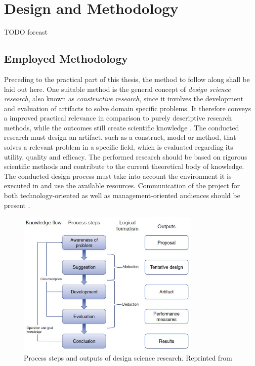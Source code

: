 \chapter{Design and Methodology}
\label{chap:design}
TODO forcast



\section{Employed Methodology}

Preceding to the practical part of this thesis, 
the method to follow along shall be laid out here.
One suitable method is the general concept of \emph{design science research}, also known as \emph{constructive research}, 
since it involves the development and evaluation of artifacts to solve domain specific problems.
It therefore conveys a improved practical relevance in comparison to purely descriptive research methods,
while the outcomes still create scientific knowledge
\autocite[][p.~v]{dresh2015designresearch}.
The conducted research must design an artifact, such as a construct, model or method, that solves a relevant problem in a specific field, which is evaluated regarding its utility, quality and efficacy.
The performed research should be based on rigorous scientific methods and contribute to the current theoretical body of knowledge.
The conducted design process must take into account the environment it is executed in and use the available resources.
Communication of the project for both technology-oriented as well as management-oriented audiences should be present
\autocite[][p.~70]{dresh2015designresearch}.

\begin{figure}[hbt]
	\centering
	\includegraphics[width=0.8\textwidth, keepaspectratio]{resources/designscienceresearchoutputs.jpg}
	\caption{\label{fig:design:designscience} Process steps and outputs of design science research. Reprinted from \textcite[][p.~83]{dresh2015designresearch}}
\end{figure}

